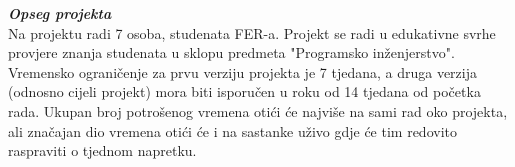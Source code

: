 \textbf{\textit{Opseg projekta}}\\

Na projektu radi 7 osoba, studenata FER-a. Projekt se radi u edukativne svrhe provjere znanja studenata u sklopu predmeta "Programsko inženjerstvo". Vremensko ograničenje za prvu verziju projekta je 7 tjedana, a druga verzija (odnosno cijeli projekt) mora biti isporučen u roku od 14 tjedana od početka rada. Ukupan broj potrošenog vremena otići će najviše na sami rad oko projekta, ali značajan dio vremena otići će i na sastanke uživo gdje će tim redovito raspraviti o tjednom napretku.

\eject
